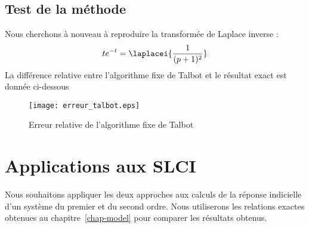 \subsection*{Test de la méthode}
Nous cherchons à nouveau à reproduire la transformée de Laplace inverse :
\[
    te^{-t}=\laplacei{\dfrac{1}{(p+1)^2}}
\]
La différence relative entre l'algorithme fixe de Talbot et le résultat exact 
est donnée ci-dessous
\begin{figure}[!b]
    \centering
    \texttt{[image: erreur\_talbot.eps]}
    \caption{Erreur relative de l'algorithme fixe de Talbot} 
\end{figure}
\clearpage
\section{Applications aux SLCI}
Nous souhaitons appliquer les deux approches aux calculs de la réponse 
indicielle d'un système du premier et du second ordre. 
Nous utiliserons les relations exactes obtenues au chapitre~\cref{chap-model} 
pour comparer les résultats obtenus.

